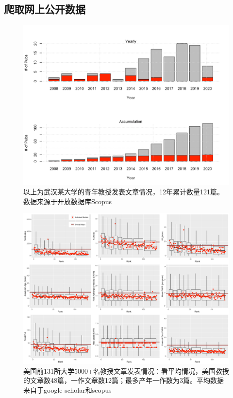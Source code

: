 \documentclass[]{scrbook}
\begin{document}
\hypertarget{ux722cux53d6ux7f51ux4e0aux516cux5f00ux6570ux636e}{%
\subsection*{爬取网上公开数据}\label{ux722cux53d6ux7f51ux4e0aux516cux5f00ux6570ux636e}}

\begin{figure}
\centering
\includegraphics{Fig/fig2.png}
\caption{以上为武汉某大学的青年教授发表文章情况，12年累计数量121篇。数据来源于开放数据库Scopus}
\end{figure}

\begin{figure}
\centering
\includegraphics{Fig/fig3.png}
\caption{美国前131所大学5000+名教授文章发表情况：看平均情况，美国教授的文章数48篇，一作文章数12篇；最多产年一作数为3篇。平均数据来自于google scholar和scopus}
\end{figure}
\end{document}
